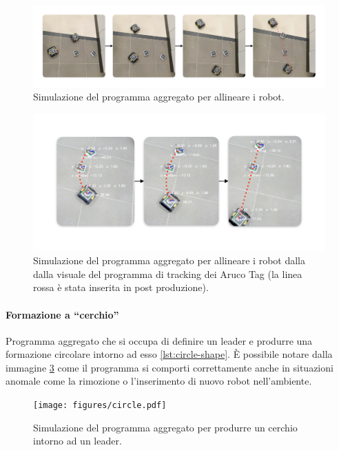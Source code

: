 \documentclass[12pt,a4paper,openright,twoside]{book}
\begin{document}
\begin{figure}
    \centering
    \includegraphics[width=.99\linewidth]{figures/line2.pdf}
    \caption{Simulazione del programma aggregato per allineare i robot.}
    \label{fig:line-shape-2}
\end{figure}

\begin{figure}
    \centering
    \includegraphics[width=.99\linewidth]{figures/line1.pdf}
    \caption{Simulazione del programma aggregato per allineare i robot dalla dalla visuale del programma di tracking dei Aruco Tag (la linea rossa è  stata inserita in post produzione).}
    \label{fig:line-shape-1}
\end{figure}

\paragraph{Formazione a ``cerchio''}

Programma aggregato che si occupa di definire un leader e produrre una formazione circolare intorno ad esso \cref{lst:circle-shape}. È possibile notare dalla immagine \cref{fig:circle-formation} come il programma si comporti correttamente anche in situazioni anomale come la rimozione o l'inserimento di nuovo robot nell'ambiente.



\begin{figure}
    \centering
    \texttt{[image: figures/circle.pdf]}
    \caption{Simulazione del programma aggregato per produrre un cerchio intorno ad un leader.}
    \label{fig:circle-formation}
\end{figure}
\end{document}

